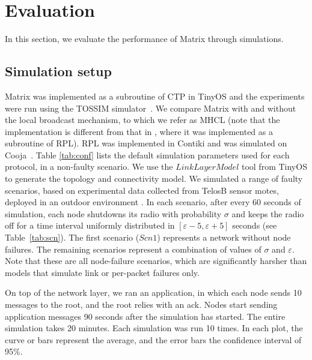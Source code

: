 \section{Evaluation}
\label{sec:results}

In this section, we evaluate the performance of Matrix through
simulations.

\subsection{Simulation setup}\label{subsec:sim}

Matrix was implemented as a subroutine of CTP in TinyOS \cite{tinyos}
and the experiments were run using the TOSSIM simulator~\cite{tossim}. We
compare Matrix with and without the local broadcast mechanism, to which we refer
as MHCL (note that the implementation is
different from that in \cite{2016techreport}, where it was implemented as a
subroutine of RPL). RPL was implemented in Contiki \cite{Dunkels:2004} and was
simulated on Cooja~\cite{Eriksson:2009}. Table \ref{tab:conf} lists the default
simulation parameters used for each protocol, in a non-faulty scenario. We use the $LinkLayerModel$ tool from TinyOS to generate the topology and connectivity model. 
We simulated a range of faulty scenarios, based on experimental data collected
from TelosB sensor motes, deployed in an outdoor
environment \cite{Baccour:2012}. In each scenario, after every 60 seconds of
simulation, each node shutdowns its radio with probability $\sigma$ and keeps
the radio off for a time interval uniformly distributed in
$[\varepsilon - 5, \varepsilon + 5]$ seconds (see Table~\ref{tab:scn}).
The first scenario ($Scn1$) represents a network without node failures. The
remaining scenarios represent a combination of values of $\sigma$ and
$\varepsilon$. Note that these are all node-failure scenarios, which are
significantly harsher than models that simulate link or per-packet
failures only.

On top of the network layer, we ran an application, in which each node
sends 10 messages to the root, and the root relies with an ack. Nodes start sending application messages 90 seconds after the simulation has started. The entire
simulation takes 20 minutes. Each simulation was run 10 times. In each plot,
the curve or bars represent the average, and the error bars the confidence
interval of 95\%.

